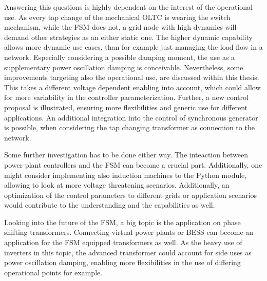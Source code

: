 Answering this questions is highly dependent on the interest of the operational use.
As every tap change of the mechanical \acs{OLTC} is wearing the switch mechanism, while the \acs{FSM} does not, a grid node with high dynamics will demand other strategies as an either static one.
The higher dynamic capability allows more dynamic use cases, than for example just managing the load flow in a network.
Especially considering a possible damping moment, the use as a supplementary power oscillation damping is conceivable.
Nevertheless, some improvements targeting also the operational use, are discussed within this thesis.
This takes a different voltage dependent enabling into account, which could allow for more variability in the controller parameterization.
Further, a new control proposal is illustrated, ensuring more flexibilities and generic use for different applications.
An additional integration into the control of synchronous generator is possible, when considering the tap changing transformer as connection to the network.

Some further investigation has to be done either way. 
The inteaction between power plant controllers and the \acs{FSM} can become a crucial part. 
Additionally, one might consider implementing also induction machines to the Python module, allowing to look at more voltage threatening scenarios.
Additionally, an optimization of the control parameters to different grids or application scenarios would contribute to the understanding and the capabilities as well. 

Looking into the future of the \acs{FSM}, a big topic is the application on phase shifting transformers.
Connecting virtual power plants or \acf{BESS} can become an application for the \acs{FSM} equipped transformers as well.
As the heavy use of inverters in this topic, the advanced transformer could account for side uses as power oscillation damping, enabling more flexibilities in the use of differing operational points for example.